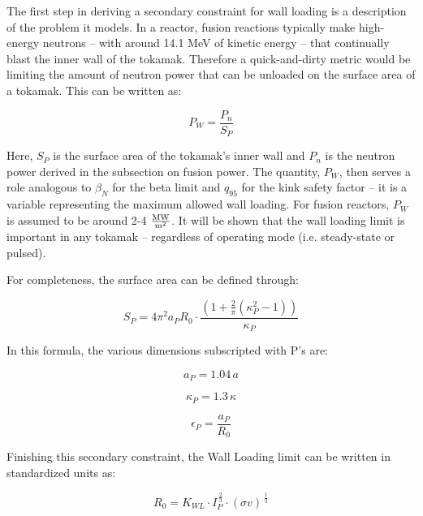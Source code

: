The first step in deriving a secondary constraint for wall loading is a description of the problem it models. In a reactor, fusion reactions typically make high-energy neutrons -- with around 14.1 MeV of kinetic energy -- that continually blast the inner wall of the tokamak. Therefore a quick-and-dirty metric would be limiting the amount of neutron power that can be unloaded on the surface area of a tokamak. This can be written as:

\begin{equation}
	P_W = \frac{ P_n }{ S_P }
\end{equation}

Here, $S_P$ is the surface area of the tokamak's inner wall and $P_n$ is the neutron power derived in the subsection on fusion power. The quantity, $P_W$, then serves a role analogous to $\beta_N$ for the beta limit and $q_{95}$ for the kink safety factor -- it is a  variable representing the maximum allowed wall loading. For fusion reactors, $P_W$ is assumed to be around 2-4 $\frac{\textnormal{MW}}{\textnormal{m}^2}$. It will be shown that the wall loading limit is important in any tokamak -- regardless of operating mode (i.e. steady-state or pulsed).

For completeness, the surface area can be defined through:

\begin{equation}
	S_P = 4 \pi^2 a_P R_0 \cdot \frac{ \left( 1 + \frac{2}{\pi} \left( \kappa_P^2 -1 \right) \right) }{ \kappa_P }
\end{equation}

In this formula, the various dimensions subscripted with P's are:

\begin{equation}
	a_P = 1.04 \, a
\end{equation}

\begin{equation}
	\kappa_P = 1.3 \, \kappa
\end{equation}

\begin{equation}
	\epsilon_P = \frac{a_P}{R_0}
\end{equation}

Finishing this secondary constraint, the Wall Loading limit can be written in standardized units as:

\begin{equation}
	\label{eq:r_wall}
	R_0 = K_{WL} \cdot I_P^{ \, \frac{2}{3} } \cdot (\sigma v) ^{ \, \frac{1}{3} }
\end{equation}

